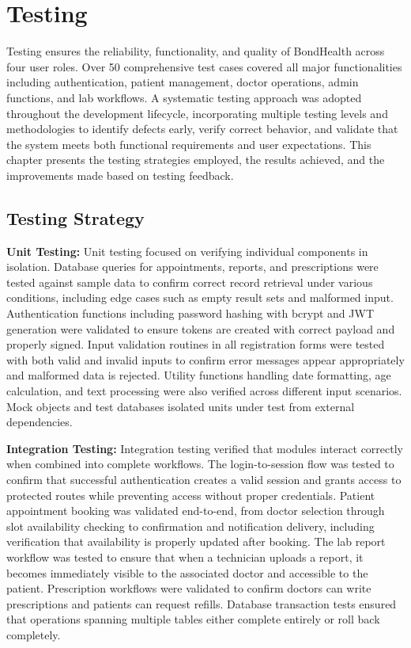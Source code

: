 \chapter{Testing}

\justifying
\noindent Testing ensures the reliability, functionality, and quality of BondHealth across four user roles. Over 50 comprehensive test cases covered all major functionalities including authentication, patient management, doctor operations, admin functions, and lab workflows. A systematic testing approach was adopted throughout the development lifecycle, incorporating multiple testing levels and methodologies to identify defects early, verify correct behavior, and validate that the system meets both functional requirements and user expectations. This chapter presents the testing strategies employed, the results achieved, and the improvements made based on testing feedback.

\section{Testing Strategy}
\justifying
\textbf{Unit Testing:} Unit testing focused on verifying individual components in isolation. Database queries for appointments, reports, and prescriptions were tested against sample data to confirm correct record retrieval under various conditions, including edge cases such as empty result sets and malformed input. Authentication functions including password hashing with bcrypt and JWT generation were validated to ensure tokens are created with correct payload and properly signed. Input validation routines in all registration forms were tested with both valid and invalid inputs to confirm error messages appear appropriately and malformed data is rejected. Utility functions handling date formatting, age calculation, and text processing were also verified across different input scenarios. Mock objects and test databases isolated units under test from external dependencies.

\justifying
\noindent \textbf{Integration Testing:} Integration testing verified that modules interact correctly when combined into complete workflows. The login-to-session flow was tested to confirm that successful authentication creates a valid session and grants access to protected routes while preventing access without proper credentials. Patient appointment booking was validated end-to-end, from doctor selection through slot availability checking to confirmation and notification delivery, including verification that availability is properly updated after booking. The lab report workflow was tested to ensure that when a technician uploads a report, it becomes immediately visible to the associated doctor and accessible to the patient. Prescription workflows were validated to confirm doctors can write prescriptions and patients can request refills. Database transaction tests ensured that operations spanning multiple tables either complete entirely or roll back completely.

